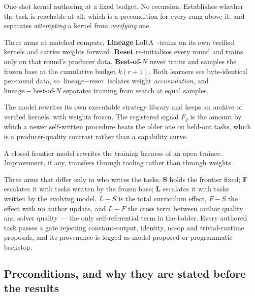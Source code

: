 \begin{description}[leftmargin=1.4em,style=nextline]
\item[{T1 --- Capability.}] One-shot kernel authoring at a fixed budget. No recursion. Establishes
  whether the task is reachable at all, which is a precondition for every rung above it, and
  separates \emph{attempting} a kernel from \emph{verifying} one.

\item[{T2 --- Weight-RSI.}] Three arms at matched compute. \textbf{Lineage} LoRA~\cite{hu2022lora}-trains on its own
  verified kernels and carries weights forward. \textbf{Reset} re-initialises every round and
  trains only on that round's producer data. \textbf{Best-of-$N$} never trains and samples the
  frozen base at the cumulative budget $k(r{+}1)$. Both learners see byte-identical per-round
  data, so $\text{lineage} - \text{reset}$ isolates weight \emph{accumulation}, and
  $\text{lineage} - \text{best-of-}N$ separates training from search at equal samples.

\item[{T3 --- Procedure-RSI.}] The model rewrites its own executable strategy library and keeps an
  archive of verified kernels, with weights frozen. The registered signal $F_g$ is the amount by
  which a newer self-written procedure beats the older one on held-out tasks, which is a
  producer-quality contrast rather than a capability curve.

\item[{T4 --- Closed$\to$Open.}] A closed frontier model rewrites the training harness of an open
  trainee. Improvement, if any, transfers through tooling rather than through weights.

\item[{T5 --- Self-play.}] Three arms that differ only in who writes the tasks. \textbf{S} holds the
  frontier fixed; \textbf{F} escalates it with tasks written by the frozen base; \textbf{L}
  escalates it with tasks written by the evolving model. $L-S$ is the total curriculum effect,
  $F-S$ the effect with no author update, and $L-F$ the cross term between author quality and
  solver quality --- the only self-referential term in the ladder. Every authored task passes a
  gate rejecting constant-output, identity, no-op and trivial-runtime proposals, and its
  provenance is logged as model-proposed or programmatic backstop.
\end{description}

\subsection{Preconditions, and why they are stated before the results}

